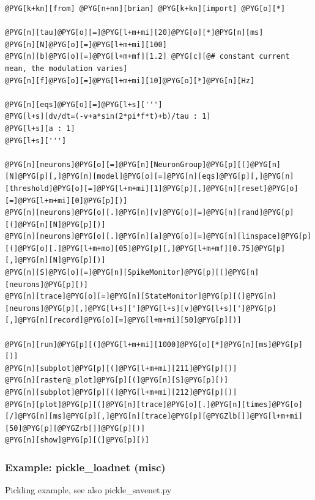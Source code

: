 \documentclass[letterpaper,10pt,english]{manual}
\begin{document}
\begin{Verbatim}[commandchars=@\[\]]
@PYG[k+kn][from] @PYG[n+nn][brian] @PYG[k+kn][import] @PYG[o][*]

@PYG[n][tau]@PYG[o][=]@PYG[l+m+mi][20]@PYG[o][*]@PYG[n][ms]
@PYG[n][N]@PYG[o][=]@PYG[l+m+mi][100]
@PYG[n][b]@PYG[o][=]@PYG[l+m+mf][1.2] @PYG[c][@# constant current mean, the modulation varies]
@PYG[n][f]@PYG[o][=]@PYG[l+m+mi][10]@PYG[o][*]@PYG[n][Hz]

@PYG[n][eqs]@PYG[o][=]@PYG[l+s][''']
@PYG[l+s][dv/dt=(-v+a*sin(2*pi*f*t)+b)/tau : 1]
@PYG[l+s][a : 1]
@PYG[l+s][''']

@PYG[n][neurons]@PYG[o][=]@PYG[n][NeuronGroup]@PYG[p][(]@PYG[n][N]@PYG[p][,]@PYG[n][model]@PYG[o][=]@PYG[n][eqs]@PYG[p][,]@PYG[n][threshold]@PYG[o][=]@PYG[l+m+mi][1]@PYG[p][,]@PYG[n][reset]@PYG[o][=]@PYG[l+m+mi][0]@PYG[p][)]
@PYG[n][neurons]@PYG[o][.]@PYG[n][v]@PYG[o][=]@PYG[n][rand]@PYG[p][(]@PYG[n][N]@PYG[p][)]
@PYG[n][neurons]@PYG[o][.]@PYG[n][a]@PYG[o][=]@PYG[n][linspace]@PYG[p][(]@PYG[o][.]@PYG[l+m+mo][05]@PYG[p][,]@PYG[l+m+mf][0.75]@PYG[p][,]@PYG[n][N]@PYG[p][)]
@PYG[n][S]@PYG[o][=]@PYG[n][SpikeMonitor]@PYG[p][(]@PYG[n][neurons]@PYG[p][)]
@PYG[n][trace]@PYG[o][=]@PYG[n][StateMonitor]@PYG[p][(]@PYG[n][neurons]@PYG[p][,]@PYG[l+s][']@PYG[l+s][v]@PYG[l+s][']@PYG[p][,]@PYG[n][record]@PYG[o][=]@PYG[l+m+mi][50]@PYG[p][)]

@PYG[n][run]@PYG[p][(]@PYG[l+m+mi][1000]@PYG[o][*]@PYG[n][ms]@PYG[p][)]
@PYG[n][subplot]@PYG[p][(]@PYG[l+m+mi][211]@PYG[p][)]
@PYG[n][raster@_plot]@PYG[p][(]@PYG[n][S]@PYG[p][)]
@PYG[n][subplot]@PYG[p][(]@PYG[l+m+mi][212]@PYG[p][)]
@PYG[n][plot]@PYG[p][(]@PYG[n][trace]@PYG[o][.]@PYG[n][times]@PYG[o][/]@PYG[n][ms]@PYG[p][,]@PYG[n][trace]@PYG[p][@PYGZlb[]]@PYG[l+m+mi][50]@PYG[p][@PYGZrb[]]@PYG[p][)]
@PYG[n][show]@PYG[p][(]@PYG[p][)]
\end{Verbatim}

\resetcurrentobjects
\hypertarget{--doc-examples-misc_pickle_loadnet}{}

\hypertarget{index-58}{}\subsubsection{Example: pickle\_loadnet (misc)}

Pickling example, see also pickle\_savenet.py
\end{document}
